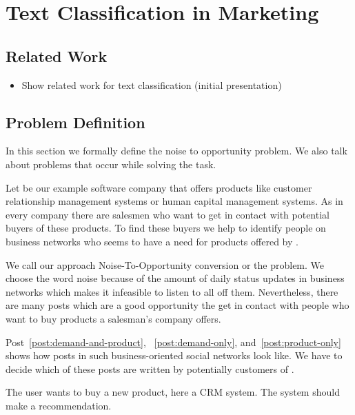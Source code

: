 
\section{Text Classification in Marketing}
\label{sec:background}

\subsection{Related Work}

\begin{itemize}
	\item Show related work for text classification (initial presentation)
\end{itemize}

\subsection{Problem Definition}
\label{sec:background-problem}

In this section we formally define the noise to opportunity problem.
We also talk about problems that occur while solving the task. 

Let \acme be our example software company that offers products like customer relationship management systems or human capital management systems. 
As in every company there are salesmen who want to get in contact with potential buyers of these products. 
To find these buyers we help \acme to identify people on business networks who seems to have a need for products offered by \acme.

We call our approach Noise-To-Opportunity conversion or the \nto problem.
We choose the word noise because of the amount of daily status updates in business networks which makes it infeasible to listen to all off them.
Nevertheless, there are many posts which are a good opportunity the get in contact with people who want to buy products a salesman's company offers. 

Post~\ref{post:demand-and-product}, ~\ref{post:demand-only}, and~\ref{post:product-only} shows how posts in such business-oriented social networks look like. 
We have to decide which of these posts are written by potentially customers of \acme. 

\begin{post}
	\centering
	\caption{The user wants to buy a new product, here a CRM system. The system should make a recommendation.}
	\label{post:demand-and-product}
\end{post}

